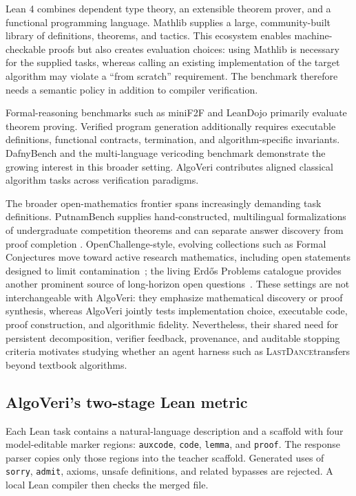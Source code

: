 \documentclass{article}
\newcommand{\lastdance}{\textsc{LastDance}}
\begin{document}
Lean 4 combines dependent type theory, an extensible theorem prover, and a functional
programming language\cite{demoura2021lean4}.  Mathlib supplies a large, community-built
library of definitions, theorems, and tactics\cite{mathlib2020}.  This ecosystem enables
machine-checkable proofs but also creates evaluation choices: using Mathlib is necessary
for the supplied tasks, whereas calling an existing implementation of the target
algorithm may violate a ``from scratch'' requirement.  The benchmark therefore needs a
semantic policy in addition to compiler verification.

Formal-reasoning benchmarks such as miniF2F\cite{zheng2022minif2f} and
LeanDojo\cite{yang2023leandojo} primarily evaluate theorem proving.  Verified program
generation additionally requires executable definitions, functional contracts,
termination, and algorithm-specific invariants.  DafnyBench\cite{loughridge2024dafnybench}
and the multi-language vericoding benchmark\cite{bursuc2025vericoding} demonstrate the
growing interest in this broader setting.  AlgoVeri contributes aligned classical
algorithm tasks across verification paradigms\cite{zhao2026algoveri}.

The broader open-mathematics frontier spans increasingly demanding task definitions.
PutnamBench supplies hand-constructed, multilingual formalizations of undergraduate
competition theorems and can separate answer discovery from proof completion
\cite{tsoukalas2024putnambench}.  OpenChallenge-style, evolving collections such as
Formal Conjectures move toward active research mathematics, including open statements
designed to limit contamination~\cite{firsching2026formalconjectures}; the living
Erd\H{o}s Problems catalogue provides another prominent source of long-horizon open
questions~\cite{erdosproblems}.  These settings are not interchangeable with AlgoVeri:
they emphasize mathematical discovery or proof synthesis, whereas AlgoVeri jointly
tests implementation choice, executable code, proof construction, and algorithmic
fidelity.  Nevertheless, their shared need for persistent decomposition, verifier
feedback, provenance, and auditable stopping criteria motivates studying whether an
agent harness such as \lastdance transfers beyond textbook algorithms.

\subsection{AlgoVeri's two-stage Lean metric}

Each Lean task contains a natural-language description and a scaffold with four
model-editable marker regions: \texttt{auxcode}, \texttt{code}, \texttt{lemma}, and
\texttt{proof}.  The response parser copies only those regions into the teacher
scaffold.  Generated uses of \texttt{sorry}, \texttt{admit}, axioms, unsafe definitions,
and related bypasses are rejected.  A local Lean compiler then checks the merged file.
\end{document}
